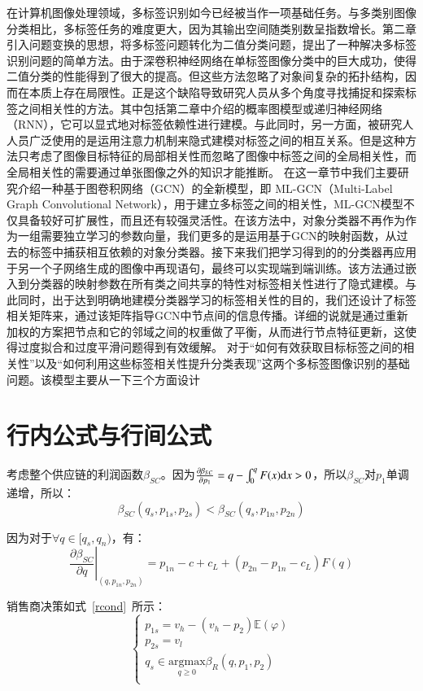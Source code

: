 在计算机图像处理领域，多标签识别如今已经被当作一项基础任务。与多类别图像分类相比，多标签任务的难度更大，因为其输出空间随类别数呈指数增长。第二章引入问题变换的思想，将多标签问题转化为二值分类问题，提出了一种解决多标签识别问题的简单方法。由于深卷积神经网络在单标签图像分类中的巨大成功，使得二值分类的性能得到了很大的提高。但这些方法忽略了对象间复杂的拓扑结构，因而在本质上存在局限性。正是这个缺陷导致研究人员从多个角度寻找捕捉和探索标签之间相关性的方法。其中包括第二章中介绍的概率图模型或递归神经网络（RNN），它可以显式地对标签依赖性进行建模。与此同时，另一方面，被研究人人员广泛使用的是运用注意力机制来隐式建模对标签之间的相互关系。但是这种方法只考虑了图像目标特征的局部相关性而忽略了图像中标签之间的全局相关性，而全局相关性的需要通过单张图像之外的知识才能推断。
在这一章节中我们主要研究介绍一种基于图卷积网络（GCN）的全新模型，即 ML-GCN（Multi-Label Graph Convolutional Network），用于建立多标签之间的相关性，ML-GCN模型不仅具备较好可扩展性，而且还有较强灵活性。在该方法中，对象分类器不再作为作为一组需要独立学习的参数向量，我们更多的是运用基于GCN的映射函数，从过去的标签中捕获相互依赖的对象分类器。接下来我们把学习得到的的分类器再应用于另一个子网络生成的图像中再现语句，最终可以实现端到端训练。该方法通过嵌入到分类器的映射参数在所有类之间共享的特性对标签相关性进行了隐式建模。与此同时，出于达到明确地建模分类器学习的标签相关性的目的，我们还设计了标签相关矩阵来，通过该矩阵指导GCN中节点间的信息传播。详细的说就是通过重新加权的方案把节点和它的邻域之间的权重做了平衡，从而进行节点特征更新，这使得过度拟合和过度平滑问题得到有效缓解。
对于“如何有效获取目标标签之间的相关性”以及“如何利用这些标签相关性提升分类表现”这两个多标签图像识别的基础问题。该模型主要从一下三个方面设计


\section{行内公式与行间公式}

考虑整个供应链的利润函数$\beta_{SC}$。因为$\frac{\partial\beta_{SC}}{\partial p_1}=q-\int_0^q F(x)\mathrm{d} x>0$，所以$\beta_{SC}$对$p_1$单调递增，所以：
\begin{equation}
\label{dscNoStgProof0}
\beta_{SC}(q_s,p_{1s},p_{2s})<\beta_{SC}(q_s,p_{1n},p_{2n})
\end{equation}

因为对于$\forall q\in[q_s, q_n)$，有：
\[ \left.\frac{\partial \beta_{SC}}{\partial q}\right|_{(q,p_{1n},p_{2n})}=p_{1n}-c+c_L+(p_{2n}-p_{1n}-c_L)F(q) \]

销售商决策如式~\eqref{rcond}~所示：
\begin{equation}
\label{rcond}
\left\{\begin{array}{l}
p_{1s}=v_h-(v_h-p_2)\mathbb{E}(\varphi) \\
p_{2s}=v_l \\
q_s \in \underset{q \geq 0}{\mathrm{argmax}} \beta_R (q, p_1, p_2) \\
\end{array}\right.
\end{equation}

